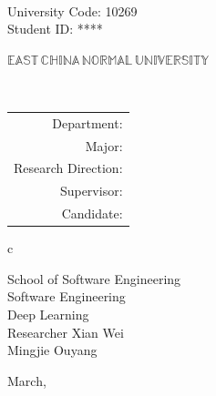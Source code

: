 \newpage

\pagestyle{empty}

\\
\hspace*{\fill} {\large University Code: 10269}\\
\hspace*{\fill} {\large Student ID: \ifnotanonymous {\stuID} \else *****\fi}

\vskip 2cm

\begin{center}
    {\Huge $\mathbb{EAST}\,\mathbb{CHINA}\,\mathbb{NORMAL}\,
            \mathbb{UNIVERSITY}$}
\end{center}

\vskip 2cm

\begin{center}
    \bfseries{\scshape{\huge {\thesisETitle}}} \\
\end{center}

\vskip 2cm

{\large
\begin{center}
\begin{tabular}{r}
    Department:         \\
    Major:              \\
    Research Direction: \\
    Supervisor:         \\
    Candidate:
\end{tabular}
\begin{tabular}c

    School of Software Engineering \\
    \hline Software Engineering \\
    \hline Deep Learning \\
    \hline Researcher Xian Wei  \\
    \hline Mingjie Ouyang \\


    \hline
\end{tabular}
\end{center}
}


\vskip 5cm  

\begin{center}
    {\Large March, \year}
\end{center}